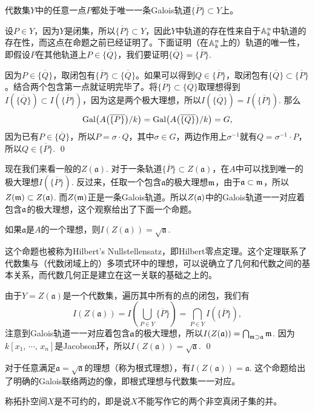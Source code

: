 \lem 代数集$Y$中的任意一点$P$都处于唯一一条Galois轨道$\overline{\{P\}}\subset Y$上。

\proof 设$P\in Y$，因为$Y$是闭集，所以$\overline{\{P\}}\subset Y$，因此$Y$中轨道的存在性来自于$\mathbb{A}^n_k$中轨道的存在性，而这点在命题之前已经证明了。下面证明（在$\mathbb{A}^n_k$上的）轨道的唯一性，即假设$P$在其他轨道上$P\in \overline{\{Q\}}$，我们要证明$\overline{\{Q\}}=\overline{\{P\}}$.

因为$P\in \overline{\{Q\}}$，取闭包有$\overline{\{P\}}\subset \overline{\{Q\}}$。如果可以得到$Q\in \overline{\{P\}}$，取闭包有$\overline{\{Q\}}\subset \overline{\{P\}}$。结合两个包含第一点就证明完毕了。将$\overline{\{P\}}\subset \overline{\{Q\}}$取理想得到$I(\overline{\{Q\}})\subset I(\overline{\{P\}})$，因为这是两个极大理想，所以$I(\overline{\{Q\}})=I(\overline{\{P\}})$. 那么
\[
	\operatorname{Gal}\bigl(A\bigl(\overline{\{P\}}\bigr)/k\bigr)=\operatorname{Gal}\bigl(A\bigl(\overline{\{Q\}}\bigr)/k\bigr)=G,
\]
因为已有$P\in \overline{\{Q\}}$，所以$P=\sigma \cdot Q$，其中$\sigma\in G$，两边作用上$\sigma^{-1}$就有$Q=\sigma^{-1}\cdot P$，所以$Q\in \overline{\{P\}}$. \qed

\para 现在我们来看一般的$Z(\mathfrak{a})$. 对于一条轨道$\overline{\{P\}}\subset Z(\mathfrak{a})$，在$A$中可以找到唯一的极大理想$I(\overline{\{P\}})$. 反过来，任取一个包含$\mathfrak{a}$的极大理想$\mathfrak{m}$，由于$\mathfrak{a}\subset \mathfrak{m}$，所以$Z(\mathfrak{m})\subset Z(\mathfrak{a})$. 而$Z(\mathfrak{m})$正是一条Galois轨道。所以$Z(\mathfrak{a})$中的Galois轨道一一对应着包含$\mathfrak{a}$的极大理想，这个观察给出了下面一个命题。

\pro 如果$\mathfrak{a}$是$A$的一个理想，则$I(Z(\mathfrak{a}))=\sqrt{\mathfrak{a}}$.

这个命题也被称为Hilbert's Nullstellensatz，即Hilbert零点定理。这个定理联系了代数集与（代数闭域上的）多项式环中的理想，可以说确立了几何和代数之间的基本关系，而代数几何正是建立在这一关联的基础之上的。

\proof 由于$Y=Z(\mathfrak{a})$是一个代数集，遍历其中所有的点的闭包，我们有
\[
	I(Z(\mathfrak{a}))=I\left(\bigcup_{P\in Y}\overline{\{P\}}\right)=\bigcap_{P\in Y}I\left(\overline{\{P\}}\right),
\]
注意到Galois轨道一一对应着包含$\mathfrak{a}$的极大理想，所以$I(Z(\mathfrak{a}))=\bigcap_{\mathfrak{m}\supset \mathfrak{a}}\mathfrak{m}$. 因为$k[x_1,\,\cdots\!,\,x_n]$是Jacobson环，所以$I(Z(\mathfrak{a}))=\sqrt{\mathfrak{a}}$. \qed

对于任意满足$\mathfrak{a}=\sqrt{\mathfrak{a}}$的理想（称为根式理想），有$I(Z(\mathfrak{a}))=\mathfrak{a}$. 这个命题给出了明确的Galois联络两边的像，即根式理想与代数集一一对应。

\para 称拓扑空间$X$是不可约的，即是说$X$不能写作它的两个非空真闭子集的并。

